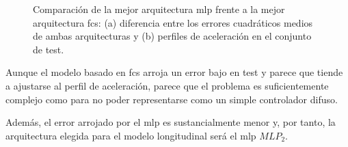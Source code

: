 \begin{figure}[b]
	\centering
	\qquad
	\caption[Comparación entre los dos tipos de modelo longitudinal]{Comparación de la mejor arquitectura \ac{mlp} frente a la mejor arquitectura \ac{fcs}: (a) diferencia entre los errores cuadráticos medios de ambas arquitecturas y (b) perfiles de aceleración en el conjunto de test.}
	\label{fig:cf-comparison-between-best-mlp-and-fcs-architecture}
\end{figure}

Aunque el modelo basado en \ac{fcs} arroja un error bajo en test y parece que tiende a ajustarse al perfil de aceleración, parece que el problema es suficientemente complejo como para no poder representarse como un simple controlador difuso.

Además, el error arrojado por el \ac{mlp} es sustancialmente menor y, por tanto, la arquitectura elegida para el modelo longitudinal será el \ac{mlp} $MLP_2$.